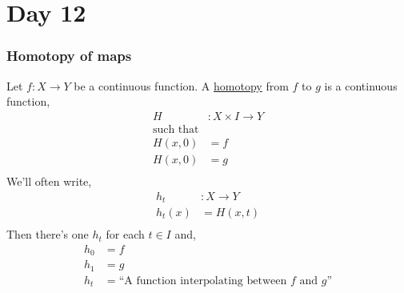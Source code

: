 \section{Day 12}
    \subsubsection{Homotopy of maps}
            \begin{definition}
            Let $f: X\rightarrow Y$ be a continuous function.
            A \underline{homotopy} from $f$ to $g$ is a continuous function,
            \begin{align*}
                H&:X\times I \rightarrow Y\\
                \text{such that}&\\
                H(x,0)&=f\\
                H(x,0)&=g\\
            \end{align*}
            We'll often write,
            \begin{align*}
                h_t&:X \rightarrow Y\\
                h_t(x)&=H(x,t)\\
            \end{align*}
            Then there's one $h_t$ for each $t\in I$ and,
            \begin{align*}
                h_0&=f\\
                h_1&=g\\
                h_t&=\text{``A function interpolating between $f$ and $g$''}\\
            \end{align*}
            \end{definition}
